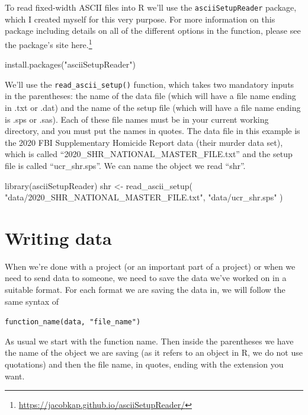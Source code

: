 \documentclass[
  a4paper,
]{krantz}
\makeatletter
\newenvironment{Shaded}{\begin{snugshade}}{\end{snugshade}}
\newcommand{\FunctionTok}[1]{\textcolor[rgb]{0,0,0}{#1}}
\newcommand{\NormalTok}[1]{#1}
\newcommand{\OtherTok}[1]{\textcolor[rgb]{0.37,0.37,0.37}{#1}}
\newcommand{\StringTok}[1]{\textcolor[rgb]{0.5,0.5,0.5}{#1}}
\renewcommand{\href}[2]{#2\footnote{\url{#1}}}
\newenvironment{kframe}{%
\medskip{}
\setlength{\fboxsep}{.8em}
 \def\at@end@of@kframe{}%
 \ifinner\ifhmode%
  \def\at@end@of@kframe{\end{minipage}}%
  \begin{minipage}{\columnwidth}%
 \fi\fi%
 \def\FrameCommand##1{\hskip\@totalleftmargin \hskip-\fboxsep
 \colorbox{shadecolor}{##1}\hskip-\fboxsep
     \hskip-\linewidth \hskip-\@totalleftmargin \hskip\columnwidth}%
 \MakeFramed {\advance\hsize-\width
   \@totalleftmargin\z@ \linewidth\hsize
   \@setminipage}}%
 {\par\unskip\endMakeFramed%
 \at@end@of@kframe}
\renewenvironment{Shaded}{\begin{kframe}}{\end{kframe}}
\makeatother
\begin{document}
To read fixed-width ASCII files into R we'll use the
\texttt{asciiSetupReader} package, which I created myself
for this very purpose. For more information on this package
including details on all of the different options in the
function, please see the package's site
\href{https://jacobkap.github.io/asciiSetupReader/}{here.}

\begin{Shaded}
\begin{Highlighting}[]
\FunctionTok{install.packages}\NormalTok{(}\StringTok{"asciiSetupReader"}\NormalTok{)}
\end{Highlighting}
\end{Shaded}

We'll use the \texttt{read\_ascii\_setup()} function, which
takes two mandatory inputs in the parentheses: the name of
the data file (which will have a file name ending in .txt or
.dat) and the name of the setup file (which will have a file
name ending is .sps or .sas). Each of these file names must
be in your current working directory, and you must put the
names in quotes. The data file in this example is the 2020
FBI Supplementary Homicide Report data (their murder data
set), which is called
``2020\_SHR\_NATIONAL\_MASTER\_FILE.txt'' and the setup file
is called ``ucr\_shr.sps''. We can name the object we read
``shr''.

\begin{Shaded}
\begin{Highlighting}[]
\FunctionTok{library}\NormalTok{(asciiSetupReader)}
\NormalTok{shr }\OtherTok{\textless{}{-}} \FunctionTok{read\_ascii\_setup}\NormalTok{(}
  \StringTok{"data/2020\_SHR\_NATIONAL\_MASTER\_FILE.txt"}\NormalTok{,}
  \StringTok{"data/ucr\_shr.sps"}
\NormalTok{)}
\end{Highlighting}
\end{Shaded}

\hypertarget{writing-data}{%
\section{Writing data}\label{writing-data}}

When we're done with a project (or an important part of a
project) or when we need to send data to someone, we need to
save the data we've worked on in a suitable format. For each
format we are saving the data in, we will follow the same
syntax of

\texttt{function\_name(data,\ "file\_name")}

As usual we start with the function name. Then inside the
parentheses we have the name of the object we are saving (as
it refers to an object in R, we do not use quotations) and
then the file name, in quotes, ending with the extension you
want.
\end{document}
